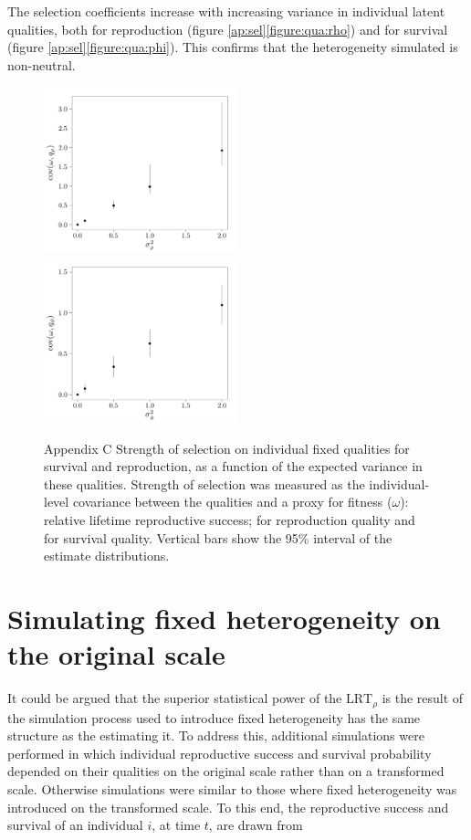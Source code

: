 The selection coefficients increase with increasing variance in individual latent qualities, both for reproduction (figure \ref{ap:sel}\ref{figure:qua:rho}) and for survival (figure \ref{ap:sel}\ref{figure:qua:phi}). This confirms that the heterogeneity simulated is non-neutral. 

\begin{figure}[H]

		{
			\includegraphics[width=0.5\textwidth]{FiguresDynHet/Figure5a}
			\label{figure:qua:rho}
		}
		{
			\includegraphics[width=0.5\textwidth]{FiguresDynHet/Figure5b}
			\label{figure:qua:phi}
		}
	\caption{ Appendix C \footnotesize Strength of selection on individual fixed qualities for survival and reproduction, as a function of the expected variance in these qualities. Strength of selection was measured as the individual-level covariance between the qualities and a proxy for fitness ($\omega$): relative lifetime reproductive success;  %
	for reproduction quality and %
	for survival quality. Vertical bars show the 95\% interval of the estimate distributions.}
	\label{figure:qua}
\end{figure}

\section{Simulating fixed heterogeneity on the original scale}\label{app:orsc}
It could be argued that the superior statistical power of the  $\mathrm{LRT}_{\rho}$ is the result of the simulation process used to introduce fixed heterogeneity has the same structure as the \MM estimating it. To address this, additional simulations were performed in which individual reproductive success and survival probability depended on their qualities on the original scale rather than on a transformed scale. Otherwise simulations were similar to those where fixed heterogeneity was introduced on the transformed scale. To this end, the reproductive success and survival of an individual $i$, at time $t$, are drawn from

